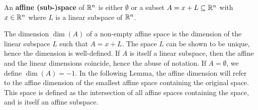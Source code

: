 \begin{definition}
An \textbf{affine (sub-)space} of $\mathbb{R}^{n}$ is either $\emptyset$ or a subset $A=x+L\subseteq \mathbb{R}^{n}$ with $x\in \mathbb{R}^{n}$ where $L$ is a linear subspace of $\mathbb{R}^{n}$.

The dimension $\dim(A)$ of a non-empty affine space is the dimension of the linear subspace $L$ such that $A=x+L$. The space $L$ can be shown to be unique, hence the dimension is well-defined. If $A$ is itself a linear subspace, then the affine and the linear dimensions coincide, hence the abuse of notation. If $A=\emptyset$, we define $\dim(A)=-1$. In the following Lemma, the affine dimension will refer to the affine dimension of the smallest affine space containing the original space. This space is defined as the intersection of all affine spaces containing the space, and is itself an affine subspace.
\end{definition}

